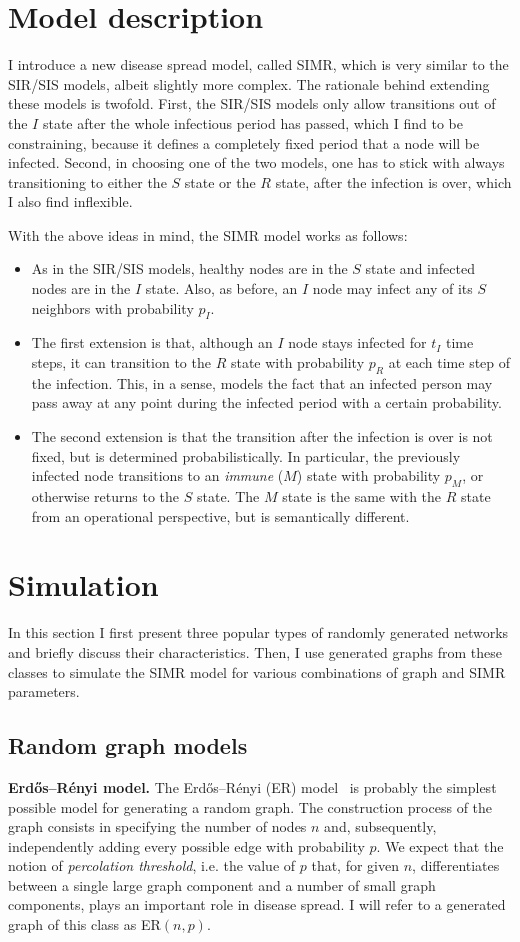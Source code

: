 \documentclass[11pt]{article} %
\begin{document}
\section{Model description}
I introduce a new disease spread model, called SIMR, which is very similar to
the SIR/SIS models, albeit slightly more complex. The rationale behind extending
these models is twofold. First, the SIR/SIS models only allow transitions out
of the $I$ state after the whole infectious period has passed, which I find to be
constraining, because it defines a completely fixed period that a node will be
infected. Second, in choosing one of the two models, one has to stick with
always transitioning to either the $S$ state or the $R$ state, after the infection
is over, which I also find inflexible.

With the above ideas in mind, the SIMR model works as follows:
\begin{itemize}
\item As in the SIR/SIS models, healthy nodes are in the $S$ state and infected
nodes are in the $I$ state. Also, as before, an $I$ node may infect any of its
$S$ neighbors with probability $p_I$.
\item The first extension is that, although an $I$ node stays infected for $t_I$
time steps, it can transition to the $R$ state with probability $p_R$ at each
time step of the infection. This, in a sense, models the fact that an infected
person may pass away at any point during the infected period with a certain
probability.
\item The second extension is that the transition after the infection is over
is not fixed, but is determined probabilistically. In particular, the previously
infected node transitions to an \emph{immune} ($M$) state with probability $p_M$,
or otherwise returns to the $S$ state. The $M$ state is the same with the $R$
state from an operational perspective, but is semantically different.
\end{itemize}

\section{Simulation}
In this section I first present three popular types of randomly generated
networks and briefly discuss their characteristics. Then, I use generated
graphs from these classes to simulate the SIMR model for various combinations
of graph and SIMR parameters.

\subsection{Random graph models}
\noindent\textbf{Erdős–Rényi model.} The Erdős–Rényi (ER) model~\cite{erdos} is
probably the simplest possible model for generating a random graph. The
construction process of the graph consists in specifying the number of
nodes $n$ and, subsequently, independently adding every possible edge
with probability $p$. We expect that the notion of \emph{percolation
threshold}, i.e. the value of $p$ that, for given $n$, differentiates
between a single large graph component and a number of small graph
components, plays an important role in disease spread. I will refer to a
generated graph of this class as ER$(n, p)$.
\end{document}
